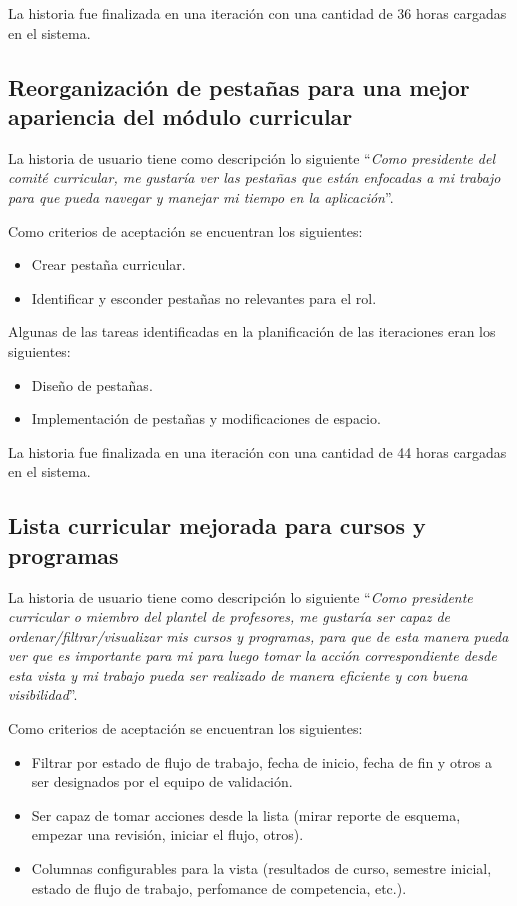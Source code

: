 La historia fue finalizada en una iteración con una cantidad de 36 horas cargadas en el sistema.

\subsection{Reorganización de pestañas para una mejor apariencia del módulo curricular}
La historia de usuario tiene como descripción lo siguiente \enquote{\textit{Como presidente del comité curricular, me gustaría ver las pestañas que están enfocadas a mi trabajo para que pueda navegar y manejar mi tiempo en la aplicación}}.

Como criterios de aceptación se encuentran los siguientes:
\begin{itemize}
	\item Crear pestaña curricular.
	\item Identificar y esconder pestañas no relevantes para el rol.
\end{itemize}

Algunas de las tareas identificadas en la planificación de las iteraciones eran los siguientes:
\begin{itemize}
	\item Diseño de pestañas.
	\item Implementación de pestañas y modificaciones de espacio.
\end{itemize}

La historia fue finalizada en una iteración con una cantidad de 44 horas cargadas en el sistema.


\subsection{Lista curricular mejorada para cursos y programas}
La historia de usuario tiene como descripción lo siguiente \enquote{\textit{Como presidente curricular o miembro del plantel de profesores, me gustaría ser capaz de ordenar/filtrar/visualizar mis cursos y programas, para que de esta manera pueda ver que es importante para mi para luego tomar la acción correspondiente desde esta vista y mi trabajo pueda ser realizado de manera eficiente y con buena visibilidad}}.

Como criterios de aceptación se encuentran los siguientes:
\begin{itemize}
	\item Filtrar por estado de flujo de trabajo, fecha de inicio, fecha de fin y otros a ser designados por el equipo de validación.
	\item Ser capaz de tomar acciones desde la lista (mirar reporte de esquema, empezar una revisión, iniciar el flujo, otros).
	\item Columnas configurables para la vista (resultados de curso, semestre inicial, estado de flujo de trabajo, perfomance de competencia, etc.).
\end{itemize}

